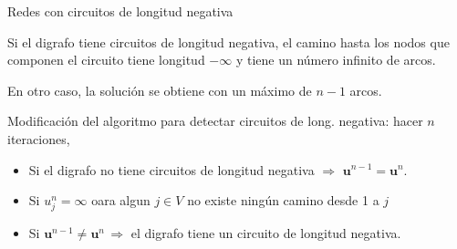 \documentclass[aspectratio=169]{beamer}
\newcommand{\V}[1]{\mathbf{#1}}
\newcommand{\vu}{\V{u}}
\begin{document}
\begin{frame}
\begin{columns}
		
	\end{columns}
\end{frame}



\begin{frame}{Redes con circuitos de longitud negativa}
	
	Si el digrafo tiene circuitos de longitud negativa, el camino hasta los nodos que componen el circuito tiene longitud $-\infty$ y tiene un n\'umero infinito de arcos.
	
	\medskip
	
	En otro caso, la soluci\'on se obtiene con un m\'aximo de $n-1$ arcos.
	
	\medskip
	
	
	Modificación del algoritmo para detectar circuitos de long. negativa: hacer $n$  iteraciones,
	\begin{itemize}
		\item
		Si el digrafo no tiene circuitos de longitud negativa $\Rightarrow$ $\vu^{n-1}=\vu^{n}$.
		\item
		Si $u_j^n=\infty$ oara algun $j\in V$ no existe ning\'un camino 		desde 1 a $j$
		\item
		Si $\vu^{n-1}\neq\vu^n\, \Rightarrow$ el digrafo tiene un circuito de longitud negativa.
	\end{itemize}
\end{frame}
\end{document}
